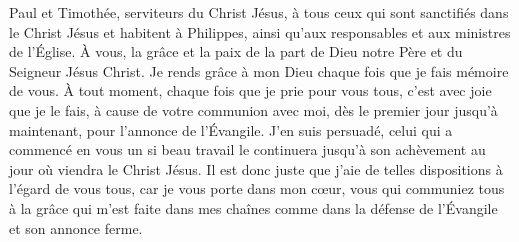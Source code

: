 Paul et Timothée, serviteurs du Christ Jésus,
	à tous ceux qui sont sanctifiés dans le Christ Jésus et habitent à Philippes,
	ainsi qu’aux responsables et aux ministres de l’Église.
À vous, la grâce et la paix de la part de Dieu notre Père et du Seigneur Jésus Christ.
Je rends grâce à mon Dieu chaque fois que je fais mémoire de vous.
À tout moment, chaque fois que je prie pour vous tous,
	c’est avec joie que je le fais, à cause de votre communion avec moi,
	dès le premier jour jusqu’à maintenant, pour l’annonce de l’Évangile.
J’en suis persuadé, celui qui a commencé en vous un si beau travail
	le continuera jusqu’à son achèvement au jour où viendra le Christ Jésus.
Il est donc juste que j’aie de telles dispositions à l’égard de vous tous,
	car je vous porte dans mon cœur,
	vous qui communiez tous à la grâce qui m’est faite dans mes chaînes
	comme dans la défense de l’Évangile et son annonce ferme.
